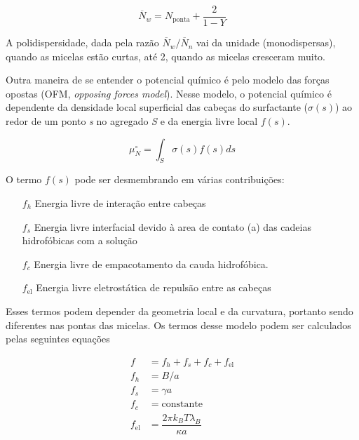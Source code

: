 		\begin{equation}
			\overline{N}_w = N_\mathrm{ponta} + \dfrac{2}{1 - Y}
			\label{eqn:distrib_tamanho_MG_reduzida_massa}
		\end{equation}
		
		A polidispersidade, dada pela razão \(\overline{N}_w / \overline{N}_n\) vai da unidade (monodispersas), quando as micelas estão curtas, até 2, quando as micelas cresceram muito. 
		
		Outra maneira de se entender o potencial químico é pelo modelo das forças opostas (OFM, \emph{opposing forces model}). Nesse modelo, o potencial químico é dependente da densidade local superficial das cabeças do surfactante (\(\sigma(s)\)) ao redor de um ponto \emph{s} no agregado \emph{S} e da energia livre local \(f(s)\). \cite{Giant_Micelles, May2001a}
		
		\begin{equation}
		\mu_N^\circ = \int_S \sigma(s) f(s) ds
		\label{eqn:OFM_potencial_quimico}
		\end{equation} 		%
		
		O termo \(f(s)\) pode ser desmembrando em várias contribuições:
		
		\begin{itemize}
			\item[\(f_h\)] Energia livre de interação entre cabeças
			\item[\(f_s\)] Energia livre interfacial devido à area de contato (a) das cadeias hidrofóbicas com a solução
			\item[\(f_c\)] Energia livre de empacotamento da cauda hidrofóbica.
			\item[\(f_\mathrm{el}\)] Energia livre eletrostática de repulsão entre as cabeças
		\end{itemize}
		
		Esses termos podem depender da geometria local e da curvatura, portanto sendo diferentes nas pontas das micelas. Os termos desse modelo podem ser calculados pelas seguintes equações \cite{Giant_Micelles}
		
		\begin{subequations}
			\begin{align}
				f   &= f_h + f_s + f_c + f_\mathrm{el} \\
				f_h &= B / a     \\
				f_s &= \gamma a  \\
				f_c &= \mathrm{constante}  \\
				f_\mathrm{el} &= \dfrac{2\pi k_BT\lambda_B}{\kappa a}
			\end{align}
			\label{eqn:componentes_OFM}
		\end{subequations}
		
